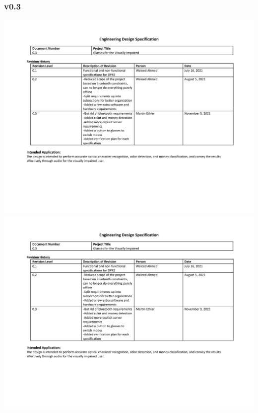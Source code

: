 \documentclass[a4paper,11pt]{article}
\begin{document}
\begin{landscape}
    \subsubsection{v0.3}
    \label{eds-0.3}
    \begin{center}
        \includegraphics[page=1,width={0.86\linewidth}]{pdf/eds_v0.3.pdf}
        \newpage
        \includegraphics[page=2,width={0.86\linewidth}]{pdf/eds_v0.3.pdf}
        \newpage

\end{center}
\end{landscape}
\end{document}

